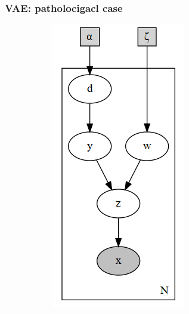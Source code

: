 \documentclass[final]{beamer}
\theoremstyle{plain}
\theoremstyle{definition}
\theoremstyle{remark}
\begin{document}
\begin{frame}
\frametitle{VAE: patholocigacl case}

\begin{figure}[h]
\centering
\begin{subfigure}[b]{0.2\textwidth}
\includegraphics[width=\textwidth]{plots/dirichlet_gmm_p.gv.png}

\end{subfigure}
\end{figure}
\end{frame}
\end{document}

